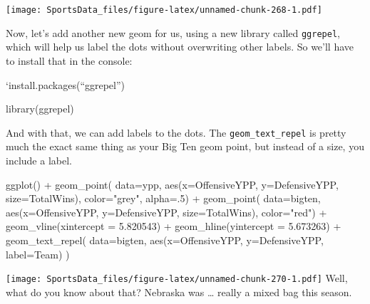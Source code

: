 \documentclass[
]{book}
\newenvironment{Shaded}{\begin{snugshade}}{\end{snugshade}}
\newcommand{\AttributeTok}[1]{\textcolor[rgb]{0.77,0.63,0.00}{#1}}
\newcommand{\DecValTok}[1]{\textcolor[rgb]{0.00,0.00,0.81}{#1}}
\newcommand{\FloatTok}[1]{\textcolor[rgb]{0.00,0.00,0.81}{#1}}
\newcommand{\FunctionTok}[1]{\textcolor[rgb]{0.00,0.00,0.00}{#1}}
\newcommand{\NormalTok}[1]{#1}
\newcommand{\SpecialCharTok}[1]{\textcolor[rgb]{0.00,0.00,0.00}{#1}}
\newcommand{\StringTok}[1]{\textcolor[rgb]{0.31,0.60,0.02}{#1}}
\begin{document}
\texttt{[image: SportsData\_files/figure-latex/unnamed-chunk-268-1.pdf]}

Now, let's add another new geom for us, using a new library called \texttt{ggrepel}, which will help us label the dots without overwriting other labels. So we'll have to install that in the console:

`install.packages(``ggrepel'')

\begin{Shaded}
\begin{Highlighting}[]
\FunctionTok{library}\NormalTok{(ggrepel)}
\end{Highlighting}
\end{Shaded}

And with that, we can add labels to the dots. The \texttt{geom\_text\_repel} is pretty much the exact same thing as your Big Ten geom point, but instead of a size, you include a label.

\begin{Shaded}
\begin{Highlighting}[]
\FunctionTok{ggplot}\NormalTok{() }\SpecialCharTok{+} 
  \FunctionTok{geom\_point}\NormalTok{(}
    \AttributeTok{data=}\NormalTok{ypp, }
    \FunctionTok{aes}\NormalTok{(}\AttributeTok{x=}\NormalTok{OffensiveYPP, }\AttributeTok{y=}\NormalTok{DefensiveYPP, }\AttributeTok{size=}\NormalTok{TotalWins), }
    \AttributeTok{color=}\StringTok{"grey"}\NormalTok{, }
    \AttributeTok{alpha=}\NormalTok{.}\DecValTok{5}\NormalTok{) }\SpecialCharTok{+} 
  \FunctionTok{geom\_point}\NormalTok{(}
    \AttributeTok{data=}\NormalTok{bigten, }
    \FunctionTok{aes}\NormalTok{(}\AttributeTok{x=}\NormalTok{OffensiveYPP, }\AttributeTok{y=}\NormalTok{DefensiveYPP, }\AttributeTok{size=}\NormalTok{TotalWins), }
    \AttributeTok{color=}\StringTok{"red"}\NormalTok{) }\SpecialCharTok{+} 
  \FunctionTok{geom\_vline}\NormalTok{(}\AttributeTok{xintercept =} \FloatTok{5.820543}\NormalTok{) }\SpecialCharTok{+} 
  \FunctionTok{geom\_hline}\NormalTok{(}\AttributeTok{yintercept =} \FloatTok{5.673263}\NormalTok{) }\SpecialCharTok{+} 
  \FunctionTok{geom\_text\_repel}\NormalTok{(}
    \AttributeTok{data=}\NormalTok{bigten, }
    \FunctionTok{aes}\NormalTok{(}\AttributeTok{x=}\NormalTok{OffensiveYPP, }\AttributeTok{y=}\NormalTok{DefensiveYPP, }\AttributeTok{label=}\NormalTok{Team)}
\NormalTok{  )}
\end{Highlighting}
\end{Shaded}

\texttt{[image: SportsData\_files/figure-latex/unnamed-chunk-270-1.pdf]}
Well, what do you know about that? Nebraska was \ldots{} really a mixed bag this season.
\end{document}
